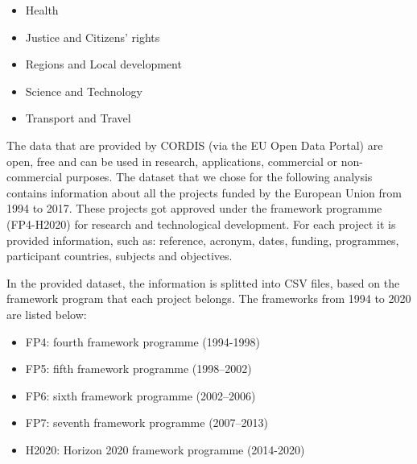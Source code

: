 \documentclass[12pt]{report}
\begin{document}
\begin{itemize}
\item Health
\item Justice and Citizens’ rights
\item Regions and Local development
\item Science and Technology
\item Transport and Travel
\end{itemize}

The data that are provided by CORDIS (via the EU Open Data Portal) are open,
free and can be used in research, applications, commercial or non-commercial
purposes. The dataset that we chose for the following analysis contains
information about all the projects funded by the European Union from 1994 to
2017. These projects got approved under the framework programme (FP4-H2020) for
research and technological development. For each project it is provided
information, such as: reference, acronym, dates, funding, programmes,
participant countries, subjects and objectives.

In the provided dataset, the information is splitted into CSV files, based on
the framework program that each project belongs. The frameworks from 1994 to
2020 are listed below:

\begin{itemize}
\item FP4: fourth framework programme (1994-1998)
\item FP5: fifth framework programme (1998–2002)
\item FP6: sixth framework programme (2002–2006)
\item FP7: seventh framework programme (2007–2013)
\item H2020: Horizon 2020 framework programme (2014-2020)
\end{itemize}
\end{document}
